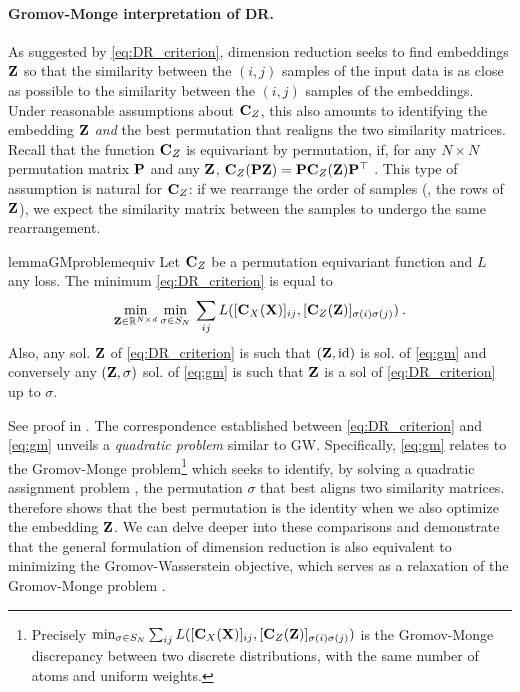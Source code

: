 \paragraph{Gromov-Monge interpretation of DR.} As suggested by
\cref{eq:DR_criterion}, dimension reduction seeks to find embeddings ${\mathbf{Z}}$ so
that the similarity between the $(i,j)$ samples of the input data is as close as
possible to the similarity between the $(i,j)$ samples of the embeddings. Under
reasonable assumptions about ${\mathbf{C}}_{Z}$, this also amounts to identifying the embedding ${\mathbf{Z}}$ \emph{and} the best permutation that realigns the two similarity matrices. %
Recall that the function ${\mathbf{C}}_{Z}$ is equivariant by permutation, if, for any $N \times N$ permutation matrix ${\mathbf{P}}$ and any
${\mathbf{Z}}$, ${\mathbf{C}}_{Z}({\mathbf{P}} {\mathbf{Z}}) = {\mathbf{P}} {\mathbf{C}}_{Z}({\mathbf{Z}}) {\mathbf{P}}^\top$ \cite{bronstein2021geometric}.
This type of assumption is natural for ${\mathbf{C}}_{Z}$: if we rearrange the order of
samples (\ie, the rows of ${\mathbf{Z}}$), we expect the similarity matrix between the
samples to undergo the same rearrangement. 
\begin{restatable}{lemma}{GMproblemequiv}
\label{lemma:GMproblemequiv}
Let ${\mathbf{C}}_{Z}$ be a permutation equivariant function and $L$ any loss. The minimum \cref{eq:DR_criterion} is equal to 
\begin{equation}
\label{eq:gm}
\min_{{\mathbf{Z}} \in \mathbb{R}^{N \times d}} \min_{\sigma \in S_N} \: \sum_{ij} L([{\mathbf{C}}_{X}({\mathbf{X}})]_{ij}, [{\mathbf{C}}_{Z}({\mathbf{Z}})]_{\sigma(i) \sigma(j)}) \:.
\end{equation}
Also, any sol. ${\mathbf{Z}}$ of \cref{eq:DR_criterion} is such that $({\mathbf{Z}}, \operatorname{id})$ is sol. of \cref{eq:gm} and conversely any $({\mathbf{Z}}, \sigma)$ sol. of \cref{eq:gm} is such that ${\mathbf{Z}}$ is a sol of \cref{eq:DR_criterion} up to $\sigma$.
\end{restatable}
See proof in . The correspondence established between \cref{eq:DR_criterion} and \cref{eq:gm}
unveils a \emph{quadratic problem} similar to GW. Specifically, \cref{eq:gm} relates to
the Gromov-Monge problem\footnote{Precisely $\min_{\sigma \in S_N} \sum_{ij} L([{\mathbf{C}}_{X}({\mathbf{X}})]_{ij}, [{\mathbf{C}}_{Z}({\mathbf{Z}})]_{\sigma(i) \sigma(j)})$ is the Gromov-Monge discrepancy between two discrete distributions, with the same number of atoms and uniform weights.}
\cite{memoli2018gromov} which seeks to identify, by solving a quadratic assignment problem \cite{cela2013quadratic}, the permutation $\sigma$ that best
aligns two similarity matrices.  therefore shows that the best permutation is the identity when we also optimize the embedding ${\mathbf{Z}}$.
We can delve deeper into these comparisons and demonstrate that the general formulation of dimension reduction is also equivalent to minimizing the Gromov-Wasserstein objective, which serves as a relaxation of the Gromov-Monge problem \cite{memoli2022comparison}.


